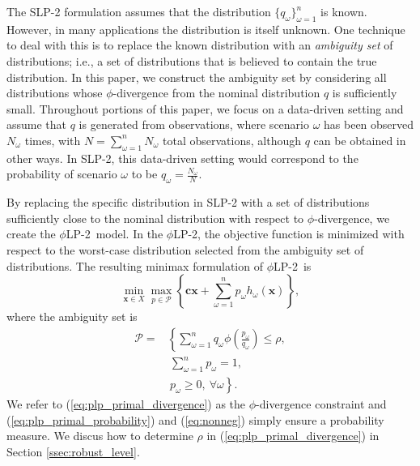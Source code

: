 \documentclass[12pt]{article}
\newcommand{\x}{\mathbf{x}}
\renewcommand{\c}{\mathbf{c}}
\theoremstyle{plain}
\theoremstyle{definition}
\theoremstyle{remark}
\newcommand{\plp}{$\phi$LP-2}
\begin{document}
The SLP-2 formulation assumes that the distribution $\{q_\omega\}_{\omega=1}^n$ is known.
However, in many applications the distribution is itself unknown.
One technique to deal with this is to replace the known distribution with an {\it ambiguity set} of distributions; i.e., a set of distributions that is believed to contain the true distribution.
In this paper, we construct the ambiguity set by considering all distributions whose $\phi$-divergence from the nominal distribution $q$ is sufficiently small.
Throughout portions of this paper, we focus on a data-driven setting and assume that $q$ is generated from observations, where scenario $\omega$ has been observed $N_\omega$ times, with $N = \sum_{\omega=1}^n N_\omega$ total observations, although $q$ can be obtained in other ways.
In SLP-2, this data-driven setting would correspond to the probability of scenario $\omega$ to be $q_\omega = \frac{N_\omega}{N}$.

By replacing the specific distribution in SLP-2 with a set of distributions sufficiently close to the nominal distribution with respect to $\phi$-divergence, we create the \plp\ model.
In the \plp, the objective function is minimized with respect to the worst-case distribution selected from the ambiguity set of distributions.
The resulting minimax formulation of \plp\ is
\begin{equation}
	\min_{\x \in X} \max_{p \in \mathcal{P}} \left\{ \c\x + \sum_{\omega=1}^{n} p_\omega h_\omega(\x) \right\}, \label{eq:plp_primal}
\end{equation}
where the ambiguity set is
\begin{align}
	\mathcal{P} = & \left\{ \sum_{\omega = 1}^{n} q_\omega \phi\left(\frac{p_\omega}{q_\omega}\right) \leq \rho, \right. \label{eq:plp_primal_divergence} \\
	& \ \sum_{\omega=1}^{n} p_\omega = 1, \label{eq:plp_primal_probability} \\
	& \ \left. p_\omega \geq 0,\ \forall \omega \right\}. \label{eq:nonneg}
\end{align}
We refer to (\ref{eq:plp_primal_divergence}) as the $\phi$-divergence constraint and (\ref{eq:plp_primal_probability}) and (\ref{eq:nonneg}) simply ensure a probability measure.
We discus how to determine $\rho$ in (\ref{eq:plp_primal_divergence}) in Section \ref{ssec:robust_level}.
\end{document}
